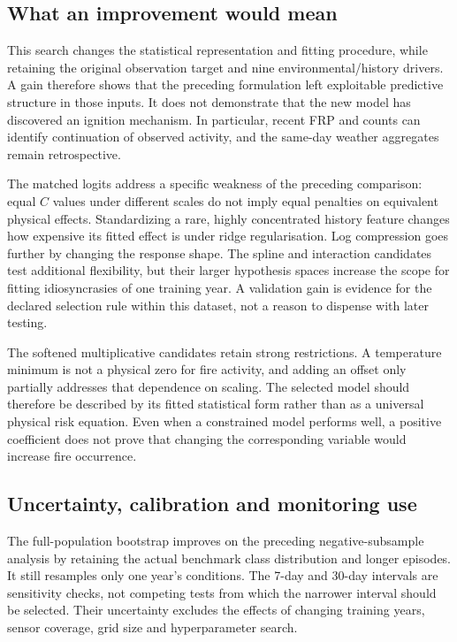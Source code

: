 \documentclass[conference]{IEEEtran}
\begin{document}
\subsection{What an improvement would mean}
This search changes the statistical representation and fitting procedure, while retaining the original observation target and nine environmental/history drivers. A gain therefore shows that the preceding formulation left exploitable predictive structure in those inputs. It does not demonstrate that the new model has discovered an ignition mechanism. In particular, recent FRP and counts can identify continuation of observed activity, and the same-day weather aggregates remain retrospective.

The matched logits address a specific weakness of the preceding comparison: equal $C$ values under different scales do not imply equal penalties on equivalent physical effects. Standardizing a rare, highly concentrated history feature changes how expensive its fitted effect is under ridge regularisation. Log compression goes further by changing the response shape. The spline and interaction candidates test additional flexibility, but their larger hypothesis spaces increase the scope for fitting idiosyncrasies of one training year. A validation gain is evidence for the declared selection rule within this dataset, not a reason to dispense with later testing.

The softened multiplicative candidates retain strong restrictions. A temperature minimum is not a physical zero for fire activity, and adding an offset only partially addresses that dependence on scaling. The selected model should therefore be described by its fitted statistical form rather than as a universal physical risk equation. Even when a constrained model performs well, a positive coefficient does not prove that changing the corresponding variable would increase fire occurrence.

\subsection{Uncertainty, calibration and monitoring use}
The full-population bootstrap improves on the preceding negative-subsample analysis by retaining the actual benchmark class distribution and longer episodes. It still resamples only one year's conditions. The 7-day and 30-day intervals are sensitivity checks, not competing tests from which the narrower interval should be selected. Their uncertainty excludes the effects of changing training years, sensor coverage, grid size and hyperparameter search.
\end{document}

